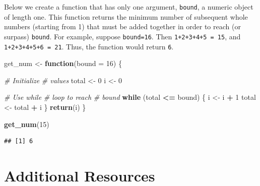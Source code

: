 \documentclass[
]{book}
\newenvironment{Shaded}{\begin{snugshade}}{\end{snugshade}}
\newcommand{\CommentTok}[1]{\textcolor[rgb]{0.56,0.35,0.01}{\textit{#1}}}
\newcommand{\ControlFlowTok}[1]{\textcolor[rgb]{0.13,0.29,0.53}{\textbf{#1}}}
\newcommand{\DataTypeTok}[1]{\textcolor[rgb]{0.13,0.29,0.53}{#1}}
\newcommand{\DecValTok}[1]{\textcolor[rgb]{0.00,0.00,0.81}{#1}}
\newcommand{\KeywordTok}[1]{\textcolor[rgb]{0.13,0.29,0.53}{\textbf{#1}}}
\newcommand{\NormalTok}[1]{#1}
\newcommand{\OperatorTok}[1]{\textcolor[rgb]{0.81,0.36,0.00}{\textbf{#1}}}
\newcommand{\StringTok}[1]{\textcolor[rgb]{0.31,0.60,0.02}{#1}}
\begin{document}
Below we create a function that has only one argument, \texttt{bound}, a numeric object of length one. This function returns the minimum number of subsequent whole numbers (starting from 1) that must be added together in order to reach (or surpass) \texttt{bound}. For example, suppose \texttt{bound=16}. Then \texttt{1+2+3+4+5\ =\ 15}, and \texttt{1+2+3+4+5+6\ =\ 21}. Thus, the function would return \texttt{6}.

\begin{Shaded}
\begin{Highlighting}[]
\NormalTok{get_num <-}\StringTok{ }\ControlFlowTok{function}\NormalTok{(}\DataTypeTok{bound =} \DecValTok{16}\NormalTok{) \{}

    \CommentTok{# Initialize}
    \CommentTok{# values}
\NormalTok{    total <-}\StringTok{ }\DecValTok{0}
\NormalTok{    i <-}\StringTok{ }\DecValTok{0}

    \CommentTok{# Use while}
    \CommentTok{# loop to reach}
    \CommentTok{# bound}
    \ControlFlowTok{while}\NormalTok{ (total }\OperatorTok{<=}\StringTok{ }\NormalTok{bound) \{}
\NormalTok{        i <-}\StringTok{ }\NormalTok{i }\OperatorTok{+}\StringTok{ }\DecValTok{1}
\NormalTok{        total <-}\StringTok{ }\NormalTok{total }\OperatorTok{+}
\StringTok{            }\NormalTok{i}
\NormalTok{    \}}
    \KeywordTok{return}\NormalTok{(i)}
\NormalTok{\}}

\KeywordTok{get_num}\NormalTok{(}\DecValTok{15}\NormalTok{)}
\end{Highlighting}
\end{Shaded}

\begin{verbatim}
## [1] 6
\end{verbatim}

\hypertarget{additional-resources-5}{%
\section{Additional Resources}\label{additional-resources-5}}
\end{document}

